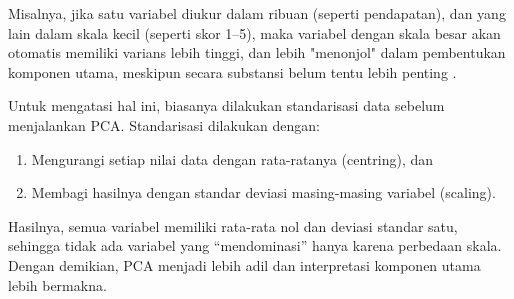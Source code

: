 \begin{itemize}
    Misalnya, jika satu variabel diukur dalam ribuan (seperti pendapatan), dan yang lain dalam skala kecil (seperti skor 1–5), maka variabel dengan skala besar akan otomatis memiliki varians lebih tinggi, dan lebih "menonjol" dalam pembentukan komponen utama, meskipun secara substansi belum tentu lebih penting \textcite{Jolliffe2016}.

    Untuk mengatasi hal ini, biasanya dilakukan standarisasi data sebelum menjalankan PCA. Standarisasi dilakukan dengan:
    \begin{enumerate}
        \item Mengurangi setiap nilai data dengan rata-ratanya (centring), dan
        \item Membagi hasilnya dengan standar deviasi masing-masing variabel (scaling).
    \end{enumerate}
    Hasilnya, semua variabel memiliki rata-rata nol dan deviasi standar satu, sehingga tidak ada variabel yang “mendominasi” hanya karena perbedaan skala. Dengan demikian, PCA menjadi lebih adil dan interpretasi komponen utama lebih bermakna.
\end{itemize}
